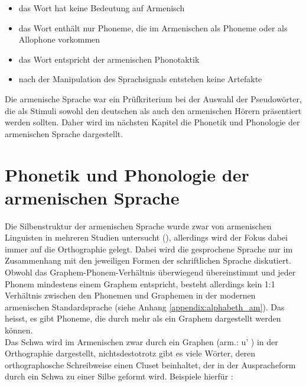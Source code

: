 \documentclass[11pt,a4paper,headsepline,twoside,toc=bibliography]{scrreprt}
\begin{document}
\begin{itemize}
	\item das Wort hat keine Bedeutung auf Armenisch
	\item das Wort enthält nur Phoneme, die im Armenischen als Phoneme oder als Allophone vorkommen
	\item das Wort entspricht der armenischen Phonotaktik
	\item nach der Manipulation des Sprachsignals entstehen keine Artefakte 
\end{itemize} 

Die armenische Sprache war ein Prüfkriterium bei der Auswahl der Pseudowörter, die als Stimuli sowohl den deutschen als auch den armenischen Hörern präsentiert werden sollten. Daher wird im nächsten Kapitel die Phonetik und Phonologie der armenischen Sprache dargestellt.

\section{Phonetik und Phonologie der armenischen Sprache}
\label{armenian_phonology}

Die Silbenstruktur der armenischen Sprache wurde zwar von armenischen Linguisten in mehreren Studien untersucht (), allerdings wird der Fokus dabei immer auf die Orthographie gelegt. Dabei wird die gesprochene Sprache nur im Zusammenhang mit den jeweiligen Formen der schriftlichen Sprache diskutiert. Obwohl das Graphem-Phonem-Verhältnis überwiegend übereinstimmt und jeder Phonem mindestens einem Graphem entspricht, besteht allerdings kein 1:1 Verhältnis zwischen den Phonemen und Graphemen in der modernen armenischen Standardsprache (siehe Anhang \ref{appendix:alphabeth_am}). Das heisst, es gibt Phoneme, die durch mehr als ein Graphem dargestellt werden können.\\

Das Schwa wird im Armenischen zwar durch ein Graphen (arm.: {\artm u' }) in der Orthographie dargestellt, nichtsdestotrotz gibt es viele Wörter, deren orthographosche Schreibweise einen Cluset beinhaltet, der in der Auspracheform durch ein Schwa zu einer Silbe geformt wird. Beispiele hierfür :





\end{document}
